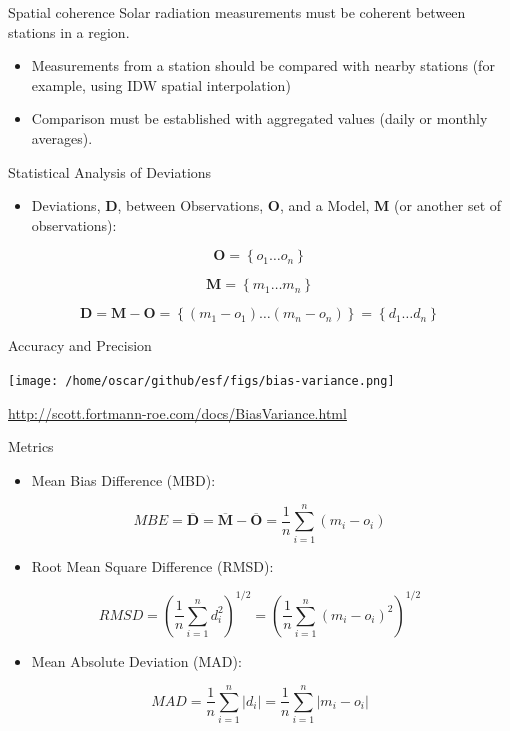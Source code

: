 \documentclass[xcolor={usenames,svgnames,dvipsnames}]{beamer}
\begin{document}
\begin{frame}[label={sec:orgebbed59}]{Spatial coherence}
Solar radiation measurements must be coherent between stations in a region.

\begin{itemize}
\item Measurements from a station should be compared with \alert{nearby stations} (for example, using IDW spatial interpolation)
\item Comparison must be established with \alert{aggregated values} (daily or monthly averages).
\end{itemize}
\end{frame}

\begin{frame}[label={sec:orge5a6736}]{Statistical Analysis of Deviations}
\begin{itemize}
\item Deviations, \(\mathbf{D}\), between Observations, \(\mathbf{O}\), and a Model, \(\mathbf{M}\) (or another set of observations):
\end{itemize}

\[
\mathbf{O} = \left\{ o_1 \dots o_n \right\}
\]

\[
\mathbf{M} = \left\{ m_1 \dots m_n  \right\}
\]

\[
\mathbf{D} = \mathbf{M} - \mathbf{O} =  \left\{ (m_1 - o_1) \dots (m_n - o_n)  \right\} = \left\{ d_1 \dots d_n  \right\}
\]
\end{frame}

\begin{frame}[label={sec:orgaeff53f}]{Accuracy and Precision}
\begin{center}
\texttt{[image: /home/oscar/github/esf/figs/bias-variance.png]}
\end{center}

\url{http://scott.fortmann-roe.com/docs/BiasVariance.html}
\end{frame}

\begin{frame}[label={sec:org23ad10b}]{Metrics}
\begin{itemize}
\item Mean Bias Difference (MBD):
\end{itemize}
\[
MBE = \overline{\mathbf{D}} = \overline{\mathbf{M}} - \overline{\mathbf{O}} = \frac{1}{n} \sum_{i=1}^n (m_i - o_i)
\]

\begin{itemize}
\item Root Mean Square Difference (RMSD):
\end{itemize}
\[
RMSD = \left(\frac{1}{n} \sum_{i=1}^n d_i^2 \right)^{1/2} =  \left( \frac{1}{n} \sum_{i=1}^n (m_i - o_i)^2  \right)^{1/2}
\]

\begin{itemize}
\item Mean Absolute Deviation (MAD):
\end{itemize}

\[
MAD = \frac{1}{n} \sum_{i=1}^n \left|d_i\right| =  \frac{1}{n} \sum_{i=1}^n \left|m_i - o_i\right|
\]
\end{frame}
\end{document}
